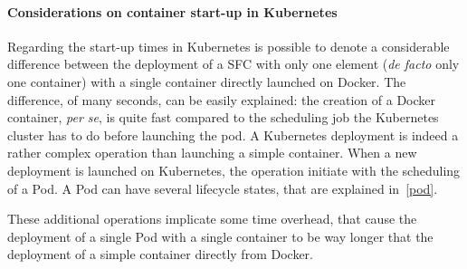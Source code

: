 \paragraph*{Considerations on container start-up in Kubernetes}
Regarding the start-up times in Kubernetes is possible to denote a considerable
difference between the deployment of a SFC with only one element
(\textit{de facto} only one container) with a single container directly launched
on Docker. The difference, of many seconds, can be easily explained: the
creation of a Docker container, \textit{per se}, is quite fast compared to the
scheduling job the Kubernetes cluster has to do before launching the pod. A
Kubernetes deployment is indeed a rather complex operation than launching a
simple container. When a new deployment is launched on Kubernetes, the operation
initiate with the scheduling of a Pod. A Pod can have several lifecycle
states, that are explained in~\ref{pod}.

These additional operations implicate some time overhead, that cause the
deployment of a single Pod with a single container to be way longer that the
deployment of a simple container directly from Docker.
